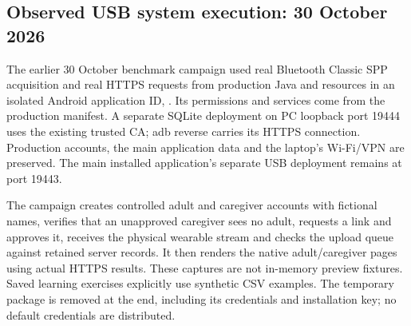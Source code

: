 \clearpage
\subsection{Observed USB system execution: 30 October 2026}
\label{app:usb-run}
The earlier 30 October benchmark campaign used real Bluetooth Classic SPP acquisition and real HTTPS requests from production Java and resources in an isolated Android application ID, . Its permissions and services come from the production manifest. A separate SQLite deployment on PC loopback port 19444 uses the existing trusted CA; adb reverse carries its HTTPS connection. Production accounts, the main application data and the laptop's Wi-Fi/VPN are preserved. The main installed application's separate USB deployment remains at port 19443.

The campaign creates controlled adult and caregiver accounts with fictional names, verifies that an unapproved caregiver sees no adult, requests a link and approves it, receives the physical wearable stream and checks the upload queue against retained server records. It then renders the native adult/caregiver pages using actual HTTPS results. These captures are not in-memory preview fixtures. Saved learning exercises explicitly use synthetic CSV examples. The temporary package is removed at the end, including its credentials and installation key; no default credentials are distributed.\cite{systemrun}

